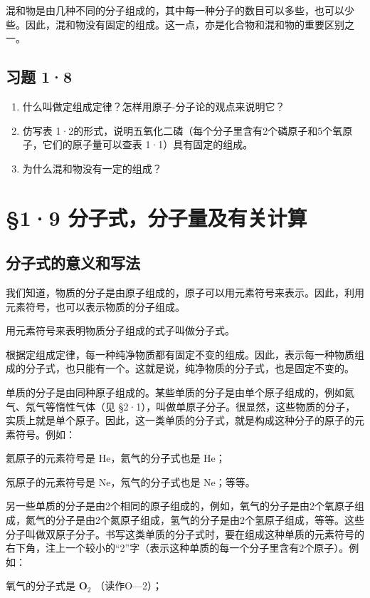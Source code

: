 混和物是由几种不同的分子组成的，其中每一种分子的数目可以多些，也可以少些。因此，混和物没有固定的组成。这一点，亦是化合物和混和物的重要区别之一。

\subsection{习题 1·8}

\begin{enumerate}
\item
  什么叫做定组成定律？怎样用原子-分子论的观点来说明它？
\item
  仿写表
  1·2的形式，说明五氧化二磷（每个分子里含有2个磷原子和5个氧原子，它们的原子量可以查表
  1·1）具有固定的组成。
\item
  为什么混和物没有一定的组成？
\end{enumerate}

\section{§1·9 分子式，分子量及有关计算}

\subsection{分子式的意义和写法}

我们知道，物质的分子是由原子组成的，原子可以用元素符号来表示。因此，利用元素符号，也可以表示物质的分子组成。

用元素符号来表明物质分子组成的式子叫做分子式。

根据定组成定律，每一种纯净物质都有固定不变的组成。因此，表示每一种物质组成的分子式，也只能有一个。这就是说，纯净物质的分子式，也是固定不变的。

单质的分子是由同种原子组成的。某些单质的分子是由单个原子组成的，例如氦气、氖气等惰性气体（见
§2·1），叫做单原子分子。很显然，这些物质的分子，实质上就是单个原子。因此，这一类单质的分子式，就是构成这种分子的原子的元素符号。例如：

氦原子的元素符号是 He，氦气的分子式也是 He；

氖原子的元素符号是 Ne，氖气的分子式也是 Ne；等等。

另一些单质的分子是由2个相同的原子组成的，例如，氧气的分子是由2个氧原子组成，氮气的分子是由2个氮原子组成，氢气的分子是由2个氢原子组成，等等。这些分子叫做双原子分子。书写这类单质的分子式时，要在组成这种单质的元素符号的右下角，注上一个较小的``2''字（表示这种单质的每一个分子里含有2个原子）。例如：

氧气的分子式是 \(\mathbf{O}_2\) （读作O---2）；

